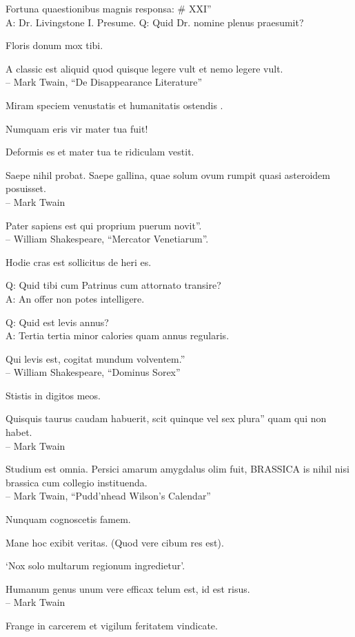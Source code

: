 \documentclass[titlepage,12pt]{memoir}
\begin{document}
Fortuna quaestionibus magnis responsa: \# XXI”\\
A: Dr. Livingstone I. Presume.
Q: Quid Dr. nomine plenus praesumit?

Floris donum mox tibi.

A classic est aliquid quod quisque legere vult
et nemo legere vult.
\\-- Mark Twain, “De Disappearance Literature”

 Miram speciem venustatis et humanitatis ostendis .

Numquam eris vir mater tua fuit!

Deformis es et mater tua te ridiculam vestit.

Saepe nihil probat. Saepe gallina, quae solum ovum rumpit
quasi asteroidem posuisset.
\\-- Mark Twain

Pater sapiens est qui proprium puerum novit”.
\\-- William Shakespeare, “Mercator Venetiarum”.

Hodie cras est sollicitus de heri es.

Q: Quid tibi cum Patrinus cum attornato transire?\\
A: An offer non potes intelligere.

Q: Quid est levis annus?\\
A: Tertia tertia minor calories quam annus regularis.

Qui levis est, cogitat mundum volventem.”
\\-- William Shakespeare, “Dominus Sorex”

Stistis in digitos meos.

Quisquis taurus caudam habuerit, scit quinque vel sex plura”
quam qui non habet.
\\-- Mark Twain

Studium est omnia. Persici amarum amygdalus olim fuit, BRASSICA is
nihil nisi brassica cum collegio instituenda.
\\-- Mark Twain, “Pudd’nhead Wilson’s Calendar”

Nunquam cognoscetis famem.

Mane hoc exibit veritas. (Quod vere cibum res est).

‘Nox solo multarum regionum ingredietur’.

Humanum genus unum vere efficax telum est, id est risus.
\\-- Mark Twain

Frange in carcerem et vigilum feritatem vindicate.
\end{document}
